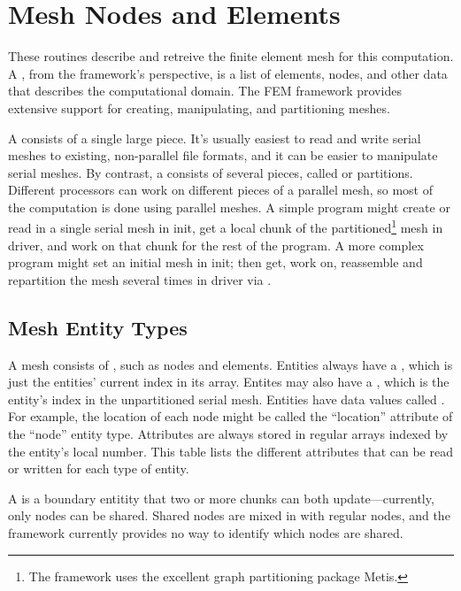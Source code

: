 \section{Mesh Nodes and Elements}
\label{sec:entities}

These routines describe and retreive the finite element mesh for this
computation.  A , from the framework's perspective, is a list of
elements, nodes, and other data that describes the computational domain.
The FEM framework provides extensive support for creating, manipulating,
and partitioning meshes. 

A  consists of a single large piece.  It's usually
easiest to read and write serial meshes to existing, non-parallel file formats,
and it can be easier to manipulate serial meshes.  By contrast, a 
 consists
of several pieces, called  or partitions.  Different processors
can work on different pieces of a parallel mesh, so most of the computation
is done using parallel meshes.  A simple program might create or read in a
single serial mesh in init, get a local chunk of the 
partitioned\footnote{The framework uses the excellent graph partitioning
package Metis.}
mesh in driver, and work on that chunk for the rest of the program.  
A more complex program might set an initial mesh in init; then get, 
work on, reassemble and repartition the mesh several times in driver 
via .

\subsection{Mesh Entity Types}
A mesh consists of , such as nodes and elements.
Entities always have a , which is just the entities'
current index in its array.  Entites may also have a , 
which is the entity's index in the unpartitioned serial mesh.
Entities have data values called .
For example, the location of each node might be called the 
``location'' attribute of the ``node'' entity type.  Attributes are
always stored in regular arrays indexed by the entity's local number.
This table lists the different attributes that can be read or
written for each type of entity.

A  is a boundary entitity that two or more chunks 
can both update---currently, only nodes can be shared.  Shared nodes
are mixed in with regular nodes, and the framework currently provides
no way to identify which nodes are shared.

